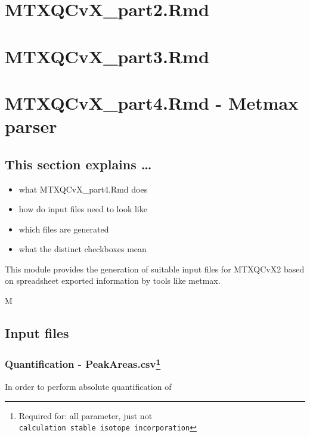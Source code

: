 \documentclass[]{book}
\providecommand{\tightlist}{%
  \setlength{\itemsep}{0pt}\setlength{\parskip}{0pt}}
\let\rmarkdownfootnote\footnote%
\def\footnote{\protect\rmarkdownfootnote}
\theoremstyle{definition}
\theoremstyle{definition}
\theoremstyle{definition}
\theoremstyle{remark}
\begin{document}
\chapter{MTXQCvX\_part2.Rmd}\label{part2}

\chapter{MTXQCvX\_part3.Rmd}\label{mtxqcvx_part3.rmd}

\chapter{MTXQCvX\_part4.Rmd - Metmax
parser}\label{mtxqcvx_part4.rmd---metmax-parser}

\section{This section explains \ldots{}}\label{this-section-explains}

\begin{itemize}
\tightlist
\item
  what MTXQCvX\_part4.Rmd does
\item
  how do input files need to look like
\item
  which files are generated
\item
  what the distinct checkboxes mean
\end{itemize}

This module provides the generation of suitable input files for MTXQCvX2
based on spreadsheet exported information by tools like metmax.

M

\section{Input files}\label{input-files-1}

\subsection[Quantification -
PeakAreas.csv]{\texorpdfstring{Quantification - PeakAreas.csv\footnote{Required
  for: all parameter, just not
  \texttt{calculation\ stable\ isotope\ incorporation}}}{Quantification - PeakAreas.csv}}\label{quantification---peakareas.csv}

In order to perform absolute quantification of
\end{document}
